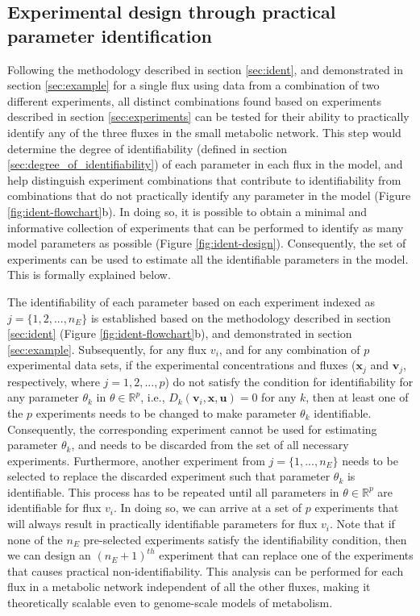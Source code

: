 \documentclass[10pt]{article}
\begin{document}
	\subsection{Experimental design through practical parameter identification}\label{sec:experimental_design}	
	Following the methodology described in section \ref{sec:ident}, and demonstrated in section \ref{sec:example} for a single flux using data from a combination of two different experiments, all distinct combinations found based on experiments described in section \ref{sec:experiments} can be tested for their ability to practically identify any of the three fluxes in the small metabolic network. This step would determine the degree of identifiability (defined in section \ref{sec:degree_of_identifiability}) of each parameter in each flux in the model, and help distinguish experiment combinations that contribute to identifiability from combinations that do not practically identify any parameter in the model (Figure \ref{fig:ident-flowchart}b). In doing so, it is possible to obtain a minimal and informative collection of experiments that can be performed to identify as many model parameters as possible (Figure \ref{fig:ident-design}). Consequently, the set of experiments can be used to estimate all the identifiable parameters in the model. This is formally explained below.
	
	The identifiability of each parameter based on each experiment indexed as $j = \{1, 2, ..., n_E\}$ is established based on the methodology described in section \ref{sec:ident} (Figure \ref{fig:ident-flowchart}b), and demonstrated in section \ref{sec:example}. Subsequently, for any flux $v_i$, and for any combination of $p$ experimental data sets, if the experimental concentrations and fluxes ($\mathbf{x}_j$ and $\mathbf{v}_j$, respectively, where $j = {1, 2,..., p}$) do not satisfy the condition for identifiability for any parameter $\theta_k$ in $\theta\in\mathbb{R}^p$, i.e., $D_k(\mathbf{v}_i, \mathbf{x}, \mathbf{u}) = 0$ for any $k$, then at least one of the $p$ experiments needs to be changed to make parameter $\theta_k$ identifiable. Consequently, the corresponding experiment cannot be used for estimating parameter $\theta_k$, and needs to be discarded from the set of all necessary experiments. Furthermore, another experiment from $j = \{1, ..., n_E\}$ needs to be selected to replace the discarded experiment such that parameter $\theta_k$ is identifiable. This process has to be repeated until all parameters in $\theta\in\mathbb{R}^p$ are identifiable for flux $v_i$. In doing so, we can arrive at a set of $p$ experiments that will always result in practically identifiable parameters for flux $v_i$. Note that if none of the $n_E$ pre-selected experiments satisfy the identifiability condition, then we can design an $(n_E+1)^{th}$ experiment that can replace one of the experiments that causes practical non-identifiability. This analysis can be performed for each flux in a metabolic network independent of all the other fluxes, making it theoretically scalable even to genome-scale models of metabolism. 	
	
\end{document}
